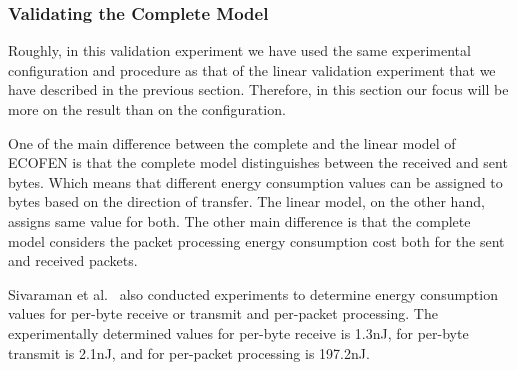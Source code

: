 \subsubsection{Validating the Complete Model}
Roughly, in this validation experiment we have used the same experimental configuration and procedure as that of the linear validation experiment that we have described in the previous section. Therefore, in this section our focus will be more on the result than on the configuration.

One of the main difference between the complete and the linear model of ECOFEN is that the complete model distinguishes between the received and sent bytes. Which means that different energy consumption values can be assigned to bytes based on the direction of transfer. The linear model, on the other hand, assigns same value for both. The other main difference is that the complete model considers the packet processing energy consumption cost both for the sent and received packets. 

Sivaraman et al.{\ }\cite{Sivaraman} also conducted experiments to determine energy consumption values for per-byte receive or transmit and per-packet processing. The experimentally determined values for per-byte receive is 1.3nJ, for per-byte transmit is 2.1nJ, and for per-packet processing is 197.2nJ. 

